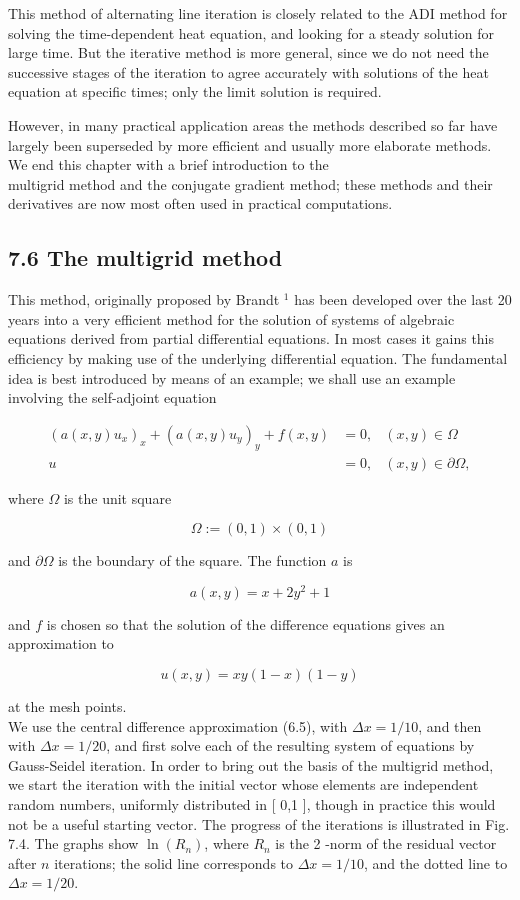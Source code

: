 \documentclass[10pt]{article}
\begin{document}
This method of alternating line iteration is closely related to the ADI method for solving the time-dependent heat equation, and looking for a steady solution for large time. But the iterative method is more general, since we do not need the successive stages of the iteration to agree accurately with solutions of the heat equation at specific times; only the limit solution is required.

However, in many practical application areas the methods described so far have largely been superseded by more efficient and usually more elaborate methods. We end this chapter with a brief introduction to the\\
multigrid method and the conjugate gradient method; these methods and their derivatives are now most often used in practical computations.

\subsection*{7.6 The multigrid method}
This method, originally proposed by Brandt \({ }^{1}\) has been developed over the last 20 years into a very efficient method for the solution of systems of algebraic equations derived from partial differential equations. In most cases it gains this efficiency by making use of the underlying differential equation. The fundamental idea is best introduced by means of an example; we shall use an example involving the self-adjoint equation

\[
\begin{aligned}
\left(a(x, y) u_{x}\right)_{x}+\left(a(x, y) u_{y}\right)_{y}+f(x, y) & =0, & (x, y) \in \Omega \\
u & =0, & (x, y) \in \partial \Omega,
\end{aligned}
\]

where \(\Omega\) is the unit square

\[
\Omega:=(0,1) \times(0,1)
\]

and \(\partial \Omega\) is the boundary of the square. The function \(a\) is

\[
a(x, y)=x+2 y^{2}+1
\]

and \(f\) is chosen so that the solution of the difference equations gives an approximation to

\[
u(x, y)=x y(1-x)(1-y)
\]

at the mesh points.\\
We use the central difference approximation (6.5), with \(\Delta x=1 / 10\), and then with \(\Delta x=1 / 20\), and first solve each of the resulting system of equations by Gauss-Seidel iteration. In order to bring out the basis of the multigrid method, we start the iteration with the initial vector whose elements are independent random numbers, uniformly distributed in [ 0,1 ], though in practice this would not be a useful starting vector. The progress of the iterations is illustrated in Fig. 7.4. The graphs show \(\ln \left(R_{n}\right)\), where \(R_{n}\) is the 2 -norm of the residual vector after \(n\) iterations; the solid line corresponds to \(\Delta x=1 / 10\), and the dotted line to \(\Delta x=1 / 20\).
\end{document}
